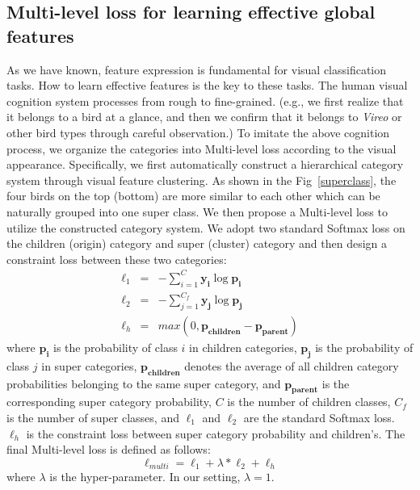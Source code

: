 \documentclass[10pt,twocolumn,letterpaper]{article}
\begin{document}
\subsection{Multi-level loss for learning effective global features}





As we have known, feature expression is fundamental for visual classification tasks. How to learn effective features is the key to these tasks. 
The human visual cognition system processes from rough to fine-grained. (e.g., we first realize that it belongs to a bird at a glance, and then we confirm that it belongs to \textit{Vireo} or other bird types through careful observation.) 
To imitate the above cognition process, we organize the categories into Multi-level loss according to the visual appearance.
Specifically, we first automatically construct a hierarchical category system through visual feature clustering. As shown in the Fig~\ref{superclass}, the four birds on the top (bottom) are more similar to each other which can be naturally grouped into one super class. We then propose a Multi-level loss to utilize the constructed category system. We adopt two standard Softmax loss on the children (origin) category and super (cluster) category and then design a constraint loss between these two categories:
\begin{eqnarray}
    \ell_1 &=& -\sum_{i=1}^C\bm{y_i}\log \bm{p_i} \\
    \ell_2 &=& -\sum_{j=1}^{C_f}\bm{y_j}\log\bm{p_j}\\
    \ell_h &=& max(0, \bm{p_{children}} - \bm{p_{parent}})
\end{eqnarray}
where $\bm{p_i}$ is the probability of class $i$ in children categories, $\bm{p_j}$ is the probability of class $j$ in super categories, $\bm{p_{children}}$ denotes the average of all children category probabilities belonging to the same super category, and $\bm{p_{parent}}$ is the corresponding super category probability, $C$ is the number of children classes, $C_f$ is the number of super classes, and $\ell_1$ and $\ell_2$ are the standard Softmax loss. $\ell_h$ is the constraint loss between super category probability and children's. 
The final Multi-level loss is defined as follows:
\begin{equation}
    \ell_{multi} = \ell_1 + \lambda * \ell_2 + \ell_h
\end{equation}
where $\lambda$ is the hyper-parameter. In our setting, $\lambda = 1$.
\end{document}
